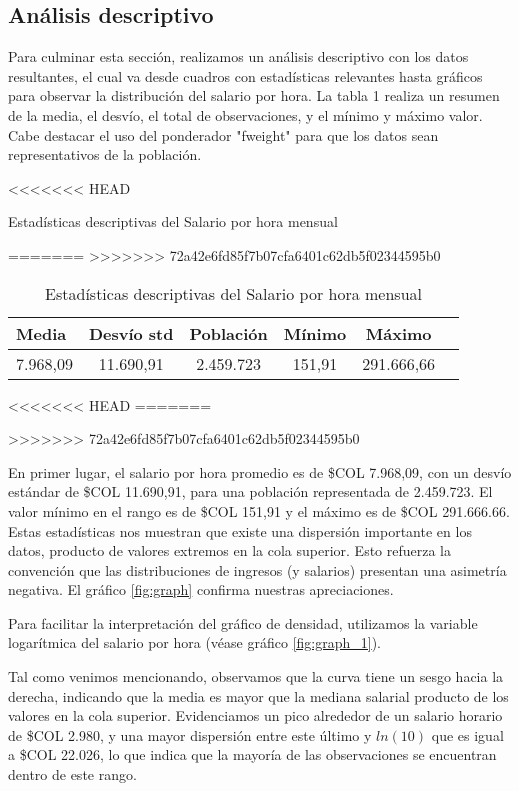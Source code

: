 \documentclass[11pt,oneside]{article}
\begin{document}
	\subsection{Análisis descriptivo}
	
	Para culminar esta sección, realizamos un análisis descriptivo con los datos resultantes, el cual va desde cuadros con estadísticas relevantes hasta gráficos para observar la distribución del salario por hora. La tabla 1 realiza un resumen de la media, el desvío, el total de observaciones, y el mínimo y máximo valor. Cabe destacar el uso del ponderador "fweight" para que los datos sean representativos de la población.
	
	\begin{table}[H]
<<<<<<< HEAD
\caption{Estadísticas descriptivas del Salario por hora mensual}
=======
>>>>>>> 72a42e6fd85f7b07cfa6401c62db5f02344595b0
		\centering
		\begin{tabular}{lccccc}
			\hline
			\textbf{Media} & \textbf{Desvío std} & \textbf{Población} & \textbf{Mínimo} & \textbf{Máximo} \\ \hline
			7.968,09 & 11.690,91 & 2.459.723 & 151,91 & 291.666,66 \\ \hline
		\end{tabular}
<<<<<<< HEAD
=======
		\caption{Estadísticas descriptivas del Salario por hora mensual}
>>>>>>> 72a42e6fd85f7b07cfa6401c62db5f02344595b0
		\label{tab:estadisticas}
	\end{table}
	
	En primer lugar, el salario por hora promedio es de \$COL 7.968,09, con un desvío estándar de \$COL 11.690,91, para una población representada de 2.459.723. El valor mínimo en el rango es de \$COL 151,91 y el máximo es de \$COL 291.666.66. Estas estadísticas nos muestran que existe una dispersión importante en los datos, producto de valores extremos en la cola superior. Esto refuerza la convención que las distribuciones de ingresos (y salarios) presentan una asimetría negativa. El gráfico \ref{fig:graph} confirma nuestras apreciaciones.
	
	Para facilitar la interpretación del gráfico de densidad, utilizamos la variable logarítmica del salario por hora (véase gráfico \ref{fig:graph_1}).
	
	Tal como venimos mencionando, observamos que la curva tiene un sesgo hacia la derecha, indicando que la media es mayor que la mediana salarial producto de los valores en la cola superior. Evidenciamos un pico alrededor de un salario horario de \$COL 2.980, y una mayor dispersión entre este último y $ln(10)$ que es igual a \$COL 22.026, lo que indica que la mayoría de las observaciones se encuentran dentro de este rango. 
	
\end{document}
